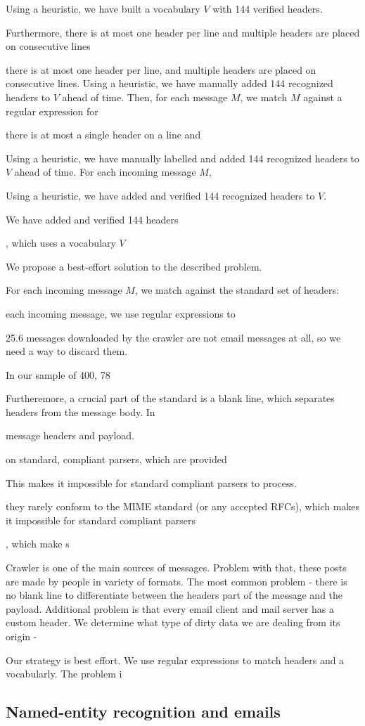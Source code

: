 Using a heuristic, we have built a vocabulary $V$ with 144 verified headers.


Furthermore, there is at most one header per line and multiple headers are placed on consecutive lines 

there is at most one header per line, and multiple headers are placed on consecutive lines. Using a heuristic, we have manually added 144 recognized headers to $V$ ahead of time. Then, for each message $M$, we match $M$ against a regular expression for  

there is at most a single header on a line and 

Using a heuristic, we have manually labelled and added 144 recognized headers to $V$ ahead of time. For each incoming message $M$, 

Using a heuristic, we have added and verified 144 recognized headers to $V$.

We have added and verified 144 headers

, which uses a vocabulary $V$ 

We propose a best-effort solution to the described problem. 

For each incoming message $M$, we match against the standard set of headers: 


each incoming message, we use regular expressions to 

25.6%
 messages downloaded by the crawler are not email messages at all, so we need a way to discard them.


In our sample of 400, 78%


Furtheremore, a crucial part of the standard is a blank line, which separates headers from the message body. In 

message headers and payload. 

on standard, compliant parsers, which are provided 

This makes it impossible for standard compliant parsers to process.

they rarely conform to the MIME standard (or any accepted RFCs), which makes it impossible for standard compliant parsers

, which make s


Crawler is one of the main sources of messages. Problem with that, these posts are made by people in variety of formats. The most common problem - there is no blank line to differentiate between the headers part of the message and the payload.  Additional problem is that every email client and mail server has a custom header. We determine what type of dirty data we are dealing from its origin - 

Our strategy is best effort. We use regular expressions to match headers and a vocabularly. The problem i


\subsection{Named-entity recognition and emails}
